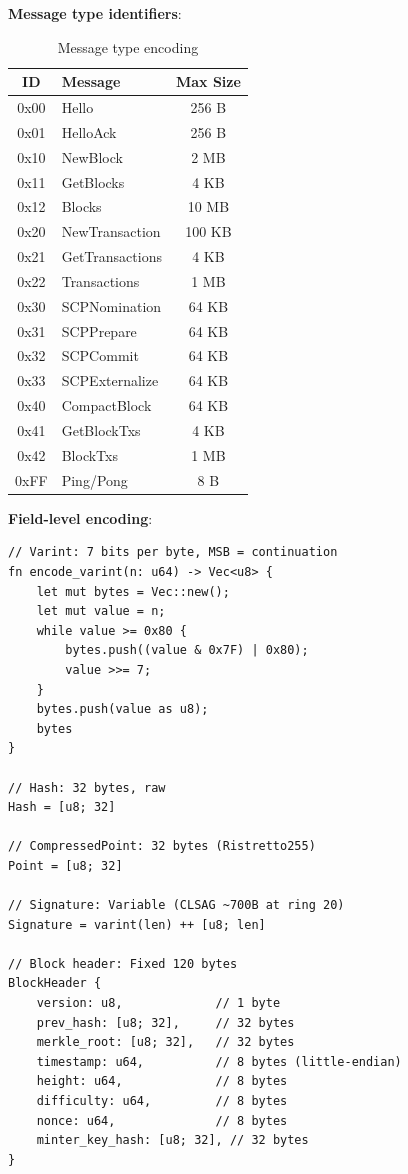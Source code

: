 \textbf{Message type identifiers}:

\begin{table}[h]
\centering
\caption{Message type encoding}
\label{tab:msg-types}
\begin{tabular}{@{}clc@{}}
\toprule
\textbf{ID} & \textbf{Message} & \textbf{Max Size} \\
\midrule
0x00 & Hello & 256 B \\
0x01 & HelloAck & 256 B \\
0x10 & NewBlock & 2 MB \\
0x11 & GetBlocks & 4 KB \\
0x12 & Blocks & 10 MB \\
0x20 & NewTransaction & 100 KB \\
0x21 & GetTransactions & 4 KB \\
0x22 & Transactions & 1 MB \\
0x30 & SCPNomination & 64 KB \\
0x31 & SCPPrepare & 64 KB \\
0x32 & SCPCommit & 64 KB \\
0x33 & SCPExternalize & 64 KB \\
0x40 & CompactBlock & 64 KB \\
0x41 & GetBlockTxs & 4 KB \\
0x42 & BlockTxs & 1 MB \\
0xFF & Ping/Pong & 8 B \\
\bottomrule
\end{tabular}
\end{table}

\textbf{Field-level encoding}:

\begin{lstlisting}[caption={Common field encodings}]
// Varint: 7 bits per byte, MSB = continuation
fn encode_varint(n: u64) -> Vec<u8> {
    let mut bytes = Vec::new();
    let mut value = n;
    while value >= 0x80 {
        bytes.push((value & 0x7F) | 0x80);
        value >>= 7;
    }
    bytes.push(value as u8);
    bytes
}

// Hash: 32 bytes, raw
Hash = [u8; 32]

// CompressedPoint: 32 bytes (Ristretto255)
Point = [u8; 32]

// Signature: Variable (CLSAG ~700B at ring 20)
Signature = varint(len) ++ [u8; len]

// Block header: Fixed 120 bytes
BlockHeader {
    version: u8,             // 1 byte
    prev_hash: [u8; 32],     // 32 bytes
    merkle_root: [u8; 32],   // 32 bytes
    timestamp: u64,          // 8 bytes (little-endian)
    height: u64,             // 8 bytes
    difficulty: u64,         // 8 bytes
    nonce: u64,              // 8 bytes
    minter_key_hash: [u8; 32], // 32 bytes
}
\end{lstlisting}

